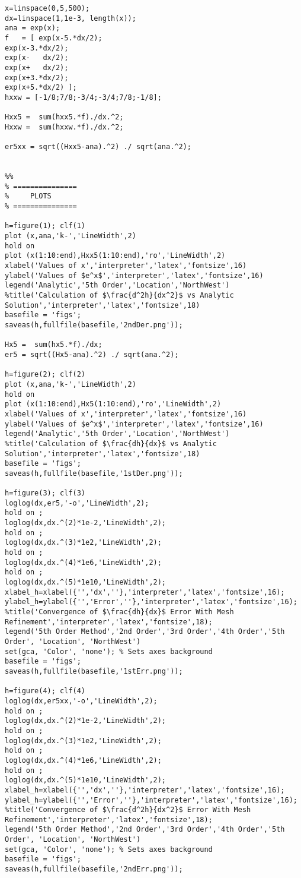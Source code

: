 \begin{verbatim}
x=linspace(0,5,500);
dx=linspace(1,1e-3, length(x));
ana = exp(x);
f   = [ exp(x-5.*dx/2);
exp(x-3.*dx/2);
exp(x-   dx/2);
exp(x+   dx/2);
exp(x+3.*dx/2);
exp(x+5.*dx/2) ];
hxxw = [-1/8;7/8;-3/4;-3/4;7/8;-1/8];

Hxx5 =  sum(hxx5.*f)./dx.^2;
Hxxw =  sum(hxxw.*f)./dx.^2;

er5xx = sqrt((Hxx5-ana).^2) ./ sqrt(ana.^2);


%%
% ===============
%     PLOTS
% ===============

h=figure(1); clf(1)
plot (x,ana,'k-','LineWidth',2)
hold on
plot (x(1:10:end),Hxx5(1:10:end),'ro','LineWidth',2)
xlabel('Values of x','interpreter','latex','fontsize',16)
ylabel('Values of $e^x$','interpreter','latex','fontsize',16)
legend('Analytic','5th Order','Location','NorthWest')
%title('Calculation of $\frac{d^2h}{dx^2}$ vs Analytic Solution','interpreter','latex','fontsize',18)
basefile = 'figs';
saveas(h,fullfile(basefile,'2ndDer.png'));

Hx5 =  sum(hx5.*f)./dx;
er5 = sqrt((Hx5-ana).^2) ./ sqrt(ana.^2);

h=figure(2); clf(2)
plot (x,ana,'k-','LineWidth',2)
hold on
plot (x(1:10:end),Hx5(1:10:end),'ro','LineWidth',2)
xlabel('Values of x','interpreter','latex','fontsize',16)
ylabel('Values of $e^x$','interpreter','latex','fontsize',16)
legend('Analytic','5th Order','Location','NorthWest')
%title('Calculation of $\frac{dh}{dx}$ vs Analytic Solution','interpreter','latex','fontsize',18)
basefile = 'figs';
saveas(h,fullfile(basefile,'1stDer.png'));

h=figure(3); clf(3)
loglog(dx,er5,'-o','LineWidth',2);
hold on ;
loglog(dx,dx.^(2)*1e-2,'LineWidth',2);
hold on ;
loglog(dx,dx.^(3)*1e2,'LineWidth',2);
hold on ;
loglog(dx,dx.^(4)*1e6,'LineWidth',2);
hold on ;
loglog(dx,dx.^(5)*1e10,'LineWidth',2);
xlabel_h=xlabel({'','dx',''},'interpreter','latex','fontsize',16);
ylabel_h=ylabel({'','Error',''},'interpreter','latex','fontsize',16);
%title('Convergence of $\frac{dh}{dx}$ Error With Mesh Refinement','interpreter','latex','fontsize',18);
legend('5th Order Method','2nd Order','3rd Order','4th Order','5th Order', 'Location', 'NorthWest')
set(gca, 'Color', 'none'); % Sets axes background
basefile = 'figs';
saveas(h,fullfile(basefile,'1stErr.png'));

h=figure(4); clf(4)
loglog(dx,er5xx,'-o','LineWidth',2);
hold on ;
loglog(dx,dx.^(2)*1e-2,'LineWidth',2);
hold on ;
loglog(dx,dx.^(3)*1e2,'LineWidth',2);
hold on ;
loglog(dx,dx.^(4)*1e6,'LineWidth',2);
hold on ;
loglog(dx,dx.^(5)*1e10,'LineWidth',2);
xlabel_h=xlabel({'','dx',''},'interpreter','latex','fontsize',16);
ylabel_h=ylabel({'','Error',''},'interpreter','latex','fontsize',16);
%title('Convergence of $\frac{d^2h}{dx^2}$ Error With Mesh Refinement','interpreter','latex','fontsize',18);
legend('5th Order Method','2nd Order','3rd Order','4th Order','5th Order', 'Location', 'NorthWest')
set(gca, 'Color', 'none'); % Sets axes background
basefile = 'figs';
saveas(h,fullfile(basefile,'2ndErr.png'));
\end{verbatim}


